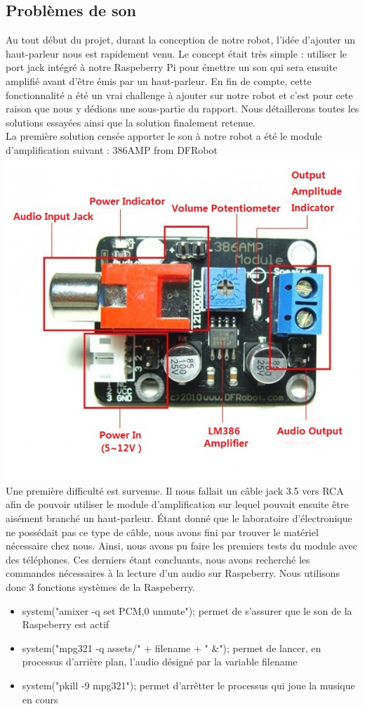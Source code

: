\documentclass[a4paper, 12pt]{report}
\begin{document}
\subsection{Problèmes de son}
Au tout début du projet, durant la conception de notre robot, l'idée d'ajouter un haut-parleur nous est rapidement venu. Le concept était très simple : utiliser le port jack intégré à notre Raspeberry Pi pour émettre un son qui sera ensuite amplifié avant d'être émis par un haut-parleur.
En fin de compte, cette fonctionnalité a été un vrai challenge à ajouter sur notre robot et c'est pour cete raison que nous y dédions une sous-partie du rapport. Nous détaillerons toutes les solutions essayées ainsi que la solution finalement retenue.
\\
La première solution censée apporter le son à notre robot a été le module d'amplification suivant : 386AMP from DFRobot
\\
\includegraphics[scale=0.5]{386AMP.jpg}
\centering
\\
Une première difficulté est survenue. Il nous fallait un câble jack 3.5 vers RCA afin de pouvoir utiliser le module d'amplification sur lequel pouvait ensuite être aisément branché un haut-parleur. Étant donné que le laboratoire d'électronique ne possédait pas ce type de câble,
nous avons fini par trouver le matériel nécessaire chez nous. Ainsi, nous avons pu faire les premiers tests du module avec des téléphones. Ces derniers étant concluants, nous avons recherché les commandes nécessaires à la lecture d'un audio sur Raspeberry. Nous utilisons donc 3 fonctions systèmes
de la Raspeberry.
\begin{itemize}
    \item system("amixer -q set PCM,0 unmute"); permet de s'assurer que le son de la Raspeberry est actif
    \item system("mpg321 -q assets/" + filename + " \&"); permet de lancer, en processus d'arrière plan, l'audio désigné par la variable filename
    \item system("pkill -9 mpg321"); permet d'arrêtter le processus qui joue la musique en cours
\end{itemize}
\end{document}
